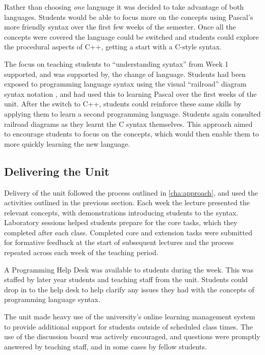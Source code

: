 Rather than choosing \emph{one} language it was decided to take advantage of both languages. Students would be able to focus more on the concepts using Pascal's more friendly syntax over the first few weeks of the semester. Once all the concepts were covered the language could be switched and students could explore the procedural aspects of C++, getting a start with a C-style syntax.

The focus on teaching students to ``understanding syntax'' from Week 1 supported, and was supported by, the change of language. Students had been exposed to programming language syntax using the visual ``railroad'' diagram syntax notation \cite{Braz:1990}, and had used this to learning Pascal over the first weeks of the unit. After the switch to C++, students could reinforce these same skills by applying them to learn a second programming language. Students again consulted railroad diagrams as they learnt the C syntax themselves. This approach aimed to encourage students to focus on the concepts, which would then enable them to more quickly learning the new language.




\subsection{Delivering the Unit} %
\label{sub:delivering_the_unit}

Delivery of the unit followed the process outlined in \cref{cha:approach}, and used the activities outlined in the previous section. Each week the lecture presented the relevant concepts, with demonstrations introducing students to the syntax. Laboratory sessions helped students prepare for the core tasks, which they completed after each class. Completed core and extension tasks were submitted for formative feedback at the start of subsequent lectures and the process repeated across each week of the teaching period.

A Programming Help Desk was available to students during the week. This was staffed by later year students and teaching staff from the unit. Students could drop in to the help desk to help clarify any issues they had with the concepts of programming language syntax.

The unit made heavy use of the university's online learning management system to provide additional support for students outside of scheduled class times. The use of the discussion board was actively encouraged, and questions were promptly answered by teaching staff, and in some cases by fellow students. 

